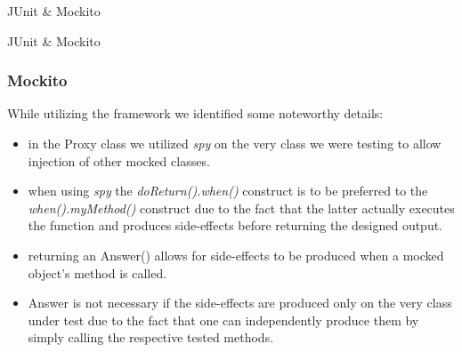 \documentclass{beamer}
\theoremstyle{definition}
\begin{document}
\begin{section}{JUnit \& Mockito}
\begin{subsection}{JUnit \& Mockito}
				\begin{frame}
					\frametitle{Mockito}
									
						While utilizing the framework we identified some noteworthy details:
						\begin{itemize}
							\item in the Proxy class we utilized \textit{spy} on the very class we were testing to allow injection of other mocked classes.
							\item when using \textit{spy} the \textit{doReturn().when()} construct is to be preferred to the \textit{when().myMethod()} construct  due to the fact that the latter actually executes the function and produces side-effects before returning the designed output.
							\item returning an Answer() allows for side-effects to be produced when a mocked object's method is called. 
							\item Answer is not necessary if the side-effects are produced only on the very class under test due to the fact that one can independently produce them by simply calling the respective tested methods.
						\end{itemize}
					\end{frame}
			\end{subsection}
		\end{section}
		
\end{document}
